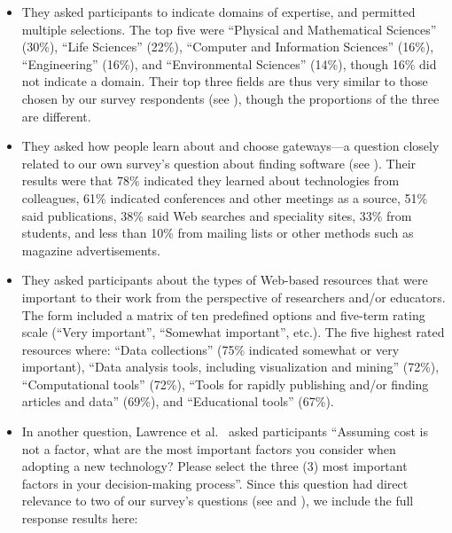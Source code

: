 \documentclass{casicswhitepaper}
\begin{document}
\begin{itemize}

\item They asked participants to indicate domains of expertise, and permitted multiple selections.  The top five were ``Physical and Mathematical Sciences'' (30\%), ``Life Sciences'' (22\%), ``Computer and Information Sciences'' (16\%), ``Engineering'' (16\%), and ``Environmental Sciences'' (14\%), though 16\% did not indicate a domain.  Their top three fields are thus very similar to those chosen by our survey respondents (see ), though the proportions of the three are different.

\item They asked how people learn about and choose gateways---a question closely related to our own survey's question about finding software (see ).  Their results were that 78\% indicated they learned about technologies from colleagues, 61\% indicated conferences and other meetings as a source, 51\% said publications, 38\% said Web searches and speciality sites, 33\% from students, and less than 10\% from mailing lists or other methods such as magazine advertisements.

\item They asked participants about the types of Web-based resources that were important to their work from the perspective of researchers and/or educators.  The form included a matrix of ten predefined options and five-term rating scale (``Very important'', ``Somewhat important'', etc.).  The five highest rated resources where: ``Data collections'' (75\% indicated somewhat or very important), ``Data analysis tools, including visualization and mining'' (72\%), ``Computational tools'' (72\%), ``Tools for rapidly publishing and/or finding articles and data'' (69\%), and ``Educational tools'' (67\%).

\item In another question, Lawrence et al.~\cite{lawrence2015science} asked participants ``Assuming cost is not a factor, what are the most important factors you consider when adopting a new technology? Please select the three (3) most important factors in your decision-making process''.  Since this question had direct relevance to two of our survey's questions (see  and ), we include the full response results here:


\end{itemize}
\end{document}
